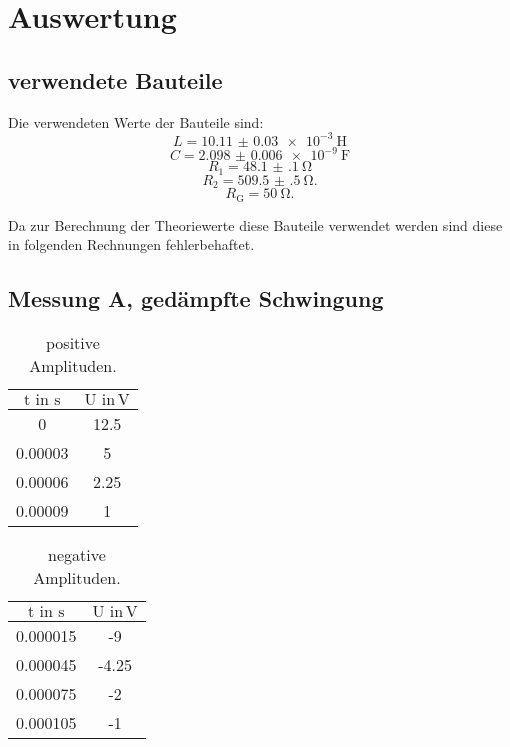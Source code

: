 \section{Auswertung}
\label{sec:Auswertung}

\subsection{verwendete Bauteile}

Die verwendeten Werte der Bauteile sind:
\begin{equation*}
  L = \SI{10.11(3)e-3}{\henry}
\end{equation*}
\begin{equation*}
  C = \SI{2.098(6)e-9}{\farad}
\end{equation*}
\begin{equation*}
  R_{\text{1}} = \SI{48.1(1)}{\ohm}
\end{equation*}
\begin{equation*}
  R_{\text{2}} = \SI{509.5(5)}{\ohm}.
\end{equation*}
\begin{equation*}
  R_{\text{G}} = \SI{50}{\ohm}.
\end{equation*}

Da zur Berechnung der Theoriewerte diese Bauteile verwendet werden sind diese
in folgenden Rechnungen fehlerbehaftet.

\subsection{Messung A, gedämpfte Schwingung}

\begin{table}[h]
  \centering
  \label{tab:posA}
  \begin{tabular}{ c c }
    \toprule
    {$\text{t} \,\, \text{in} \,\,\si{\second}$}
   &{$\text{U} \,\, \text{in} \,\si{\volt}$} \\

    \midrule
    0       & 12.5 \\
    0.00003 &  5   \\
    0.00006 &  2.25\\
    0.00009 &  1   \\
    \bottomrule
  \end{tabular}
  \caption{positive Amplituden.}
\end{table}

\begin{table}[h]
  \centering
  \label{tab:negA}
  \begin{tabular}{ c c }
    \toprule
    {$\text{t} \,\, \text{in} \,\,\si{\second}$}
   &{$\text{U} \,\, \text{in} \,\si{\volt}$} \\

    \midrule
    0.000015 & -9   \\
    0.000045 & -4.25\\
    0.000075 & -2   \\
    0.000105 & -1   \\
    \bottomrule
  \end{tabular}
  \caption{negative Amplituden.}
\end{table}

